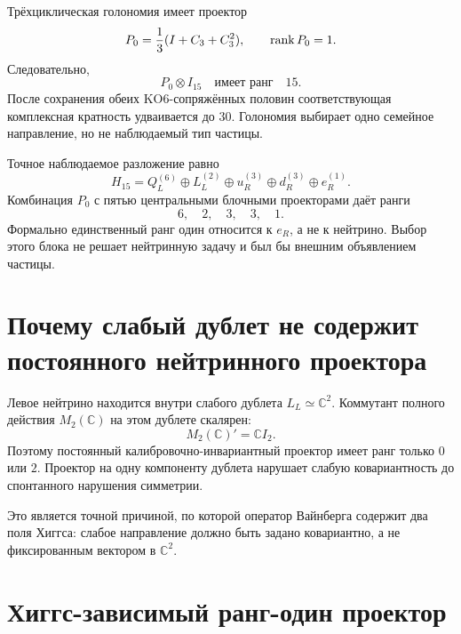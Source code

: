 Трёхциклическая голономия имеет проектор
\begin{equation}
 P_0=\frac13(I+C_3+C_3^2),
 \qquad \operatorname{rank} P_0=1.
 \label{eq:v5-projector-p0-again}
\end{equation}
Следовательно,
\begin{equation}
 P_0\otimes I_{15}
 \quad\text{имеет ранг}\quad15.
 \label{eq:v5-projector-family-rank15}
\end{equation}
После сохранения обеих KO6-сопряжённых половин соответствующая комплексная
кратность удваивается до $30$. Голономия выбирает одно семейное направление,
но не наблюдаемый тип частицы.

Точное наблюдаемое разложение равно
\begin{equation}
 H_{15}=Q_L^{(6)}\oplus L_L^{(2)}\oplus u_R^{(3)}
 \oplus d_R^{(3)}\oplus e_R^{(1)}.
 \label{eq:v5-projector-observed-blocks}
\end{equation}
Комбинация $P_0$ с пятью центральными блочными проекторами даёт ранги
\begin{equation}
 6,\quad2,\quad3,\quad3,\quad1.
 \label{eq:v5-projector-combined-ranks}
\end{equation}
Формально единственный ранг один относится к $e_R$, а не к нейтрино.
Выбор этого блока не решает нейтринную задачу и был бы внешним объявлением
частицы.

\section{Почему слабый дублет не содержит постоянного нейтринного проектора}

Левое нейтрино находится внутри слабого дублета $L_L\simeq\mathbb C^2$.
Коммутант полного действия $M_2(\mathbb C)$ на этом дублете скалярен:
\begin{equation}
 M_2(\mathbb C)'=\mathbb C I_2.
\end{equation}
Поэтому постоянный калибровочно-инвариантный проектор имеет ранг только
$0$ или $2$. Проектор на одну компоненту дублета нарушает слабую
ковариантность до спонтанного нарушения симметрии.

Это является точной причиной, по которой оператор Вайнберга содержит два
поля Хиггса: слабое направление должно быть задано ковариантно, а не
фиксированным вектором в $\mathbb C^2$.

\section{Хиггс-зависимый ранг-один проектор}

